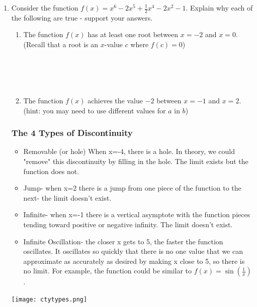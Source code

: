 \documentclass[12pt]{report}
\begin{document}
\begin{enumerate}[resume*]
\item Consider the function $f(x)=x^{6}-2x^{5}+\frac{1}{2}x^{4}-2x^{2}-1$. Explain why each of the following are true - support your answers.\\
\begin{enumerate}[label=\alph*.]
    \item The function $f(x)$ has at least one root between $x=-2$ and $x=0$. (Recall that a root is an $x$-value $c$ where $f(c)=0$)\\\\\\\\\\
    \item The function $f(x)$ achieves the value $-2$ between $x=-1$ and $x=2$. (hint: you may need to use different values for $a$ in $b$)
\end{enumerate}









\iffalse\subsubsection*{The 4 Types of Discontinuity}

\begin{itemize}
\item Removable (or hole) When x=-4, there is a hole. In theory, we could "remove" this discontinuity by filling in the hole. The limit exists but the function does not.
\item Jump- when x=2 there is a jump from one piece of the function to the next- the limit doesn't exist.
\item Infinite- when x=-1 there is a vertical asymptote with the function pieces tending toward positive or negative infinity. The limit doesn't exist.
\item Infinite Oscillation- the closer x gets to 5, the faster the function oscillates. It oscillates so quickly that there is no one value that we can approximate as accurately as desired by making x close to 5, so there is no limit.  For example, the function could be similar to $f\left(x\right)=\sin\left(\frac{1}{x}\right)$.
\end{itemize}

\texttt{[image: ctytypes.png]}


\end{enumerate}
\end{document}
